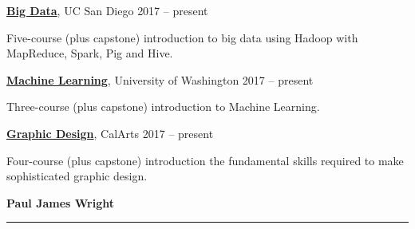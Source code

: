 \documentclass[10pt]{article}
\newcommand{\makeheading}[2][]%
        {\hspace*{-\marginparsep minus \marginparwidth}%
         \begin{minipage}[t]{\textwidth+\marginparwidth+\marginparsep}%
             {\large \bfseries #2 \hfill #1}\\[-0.15\baselineskip]%
                 \rule{\columnwidth}{1pt}%
         \end{minipage}}
\renewcommand{\section}[1]{\pagebreak[3]%
    \vspace{1.3\baselineskip}%
    \phantomsection\addcontentsline{toc}{section}{#1}%
    \noindent\llap{\scshape\smash{\parbox[t]{\marginparwidth}{\hyphenpenalty=10000\raggedright #1}}}%
    \vspace{-\baselineskip}\par}
\begin{document}
\begin{innerlist}
    \item[] {\bf{\href{https://www.coursera.org/specializations/big-data}{Big Data}}}, UC San Diego \hfill{2017 -- present}
    \begin{innerlist}
    	\item[]  Five-course (plus capstone) introduction to big data using Hadoop with MapReduce, Spark, Pig and Hive.
    \end{innerlist}        
    \item[] {\bf{\href{https://www.coursera.org/specializations/machine-learning}{Machine Learning}}}, University of Washington \hfill{2017 -- present}
    \begin{innerlist}
    	\item[] Three-course (plus capstone) introduction to Machine Learning.
    \end{innerlist}       
    \item[] {\bf{\href{https://www.coursera.org/specializations/graphic-design}{Graphic Design}}}, CalArts \hfill{2017 -- present}
    \begin{innerlist}
    	\item[] Four-course (plus capstone) introduction the fundamental skills required to make sophisticated graphic design. \\
    \end{innerlist}
 \end{innerlist}

\newpage
\makeheading{Paul James Wright} 
\end{document}
